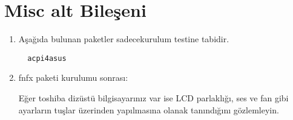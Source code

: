 \documentclass[a4paper,10pt]{article}
\begin{document}
\section{Misc alt Bileşeni}
\begin{enumerate}
 \item Aşağıda bulunan paketler sadecekurulum testine tabidir.
\begin{verbatim}
  acpi4asus
\end{verbatim}

\item fnfx paketi kurulumu sonrası:

Eğer toshiba dizüstü bilgisayarınız var ise LCD parlaklığı, ses ve fan gibi ayarların tuşlar üzerinden yapılmasına olanak tanındığını gözlemleyin.
\end{enumerate}
\end{document}
